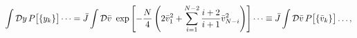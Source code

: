 \begin{equation}
\int {\cal D}y\, P\bigl[\{ y_k\} \bigr] \dots 
= \bar J \int {\cal D} \bar v\,\, \exp \left[ -\frac{N}{4} \left( 2
\bar v_1^2 +\sum_{i=1}^{N-2} \frac{i+2}{i+1} \bar v_{N-i}^2 \right)
\right] \dots \equiv \bar J \int {\cal D} \bar v\, P\bigl[\{ \bar
v_k\} \bigr] \dots, \label{B11}
\end{equation}

